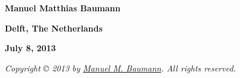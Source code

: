 \begin{center}
\vspace{0.7cm}

\begin{huge}
\textbf{\textsf{Manuel Matthias Baumann}}\\
\end{huge}

\vspace{1cm}

\textbf{\textsf{Delft, The Netherlands \\}}

\textbf{\textsf{\scriptsize{July 8, 2013}}}

\vspace{1.5cm}

\textit{\textsf{Copyright \copyright{} 2013 by \href{mailto:manuelmbaumann@gmail.com}{Manuel M. Baumann}. All rights reserved.}}
\end{center}

\newpage

\thispagestyle{empty}

\quad

\newpage

\thispagestyle{empty}

